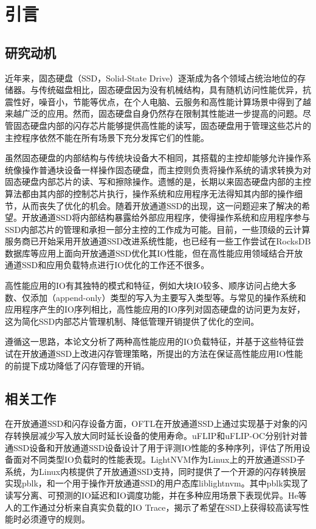 \chapter{引言}
\label{cha:intro}

\section{研究动机}
近年来，固态硬盘（SSD，Solid-State Drive）逐渐成为各个领域占统治地位的存储器。与传统磁盘相比，固态硬盘因为没有机械结构，具有随机访问性能优异，抗震性好，噪音小，节能等优点，在个人电脑、云服务和高性能计算场景中得到了越来越广泛的应用。然而，固态硬盘自身仍然存在限制其性能进一步提高的问题。尽管固态硬盘内部的闪存芯片能够提供高性能的读写，固态硬盘用于管理这些芯片的主控程序依然不能在所有场景下充分发挥它们的性能\cite{bjorling_lightnvm:_nodate}。

虽然固态硬盘的内部结构与传统块设备大不相同，其搭载的主控却能够允许操作系统像操作普通块设备一样操作固态硬盘，而主控则负责将操作系统的请求转换为对固态硬盘内部芯片的读、写和擦除操作。遗憾的是，长期以来固态硬盘内部的主控算法都由其内部的控制芯片执行，操作系统和应用程序无法得知其内部的操作细节，从而丧失了优化的机会。随着开放通道SSD的出现，这一问题迎来了解决的希望。开放通道SSD将内部结构暴露给外部应用程序，使得操作系统和应用程序参与SSD内部芯片的管理和承担一部分主控的工作成为可能。目前，一些顶级的云计算服务商已开始采用开放通道SSD改进系统性能\cite{wang_efficient_2014}，也已经有一些工作尝试在RocksDB数据库等应用上面向开放通道SSD优化其IO性能\cite{gonzalez_towards_nodate}，但在高性能应用领域结合开放通道SSD和应用负载特点进行IO优化的工作还不很多。

高性能应用的IO有其独特的模式和特征，例如大块IO较多、顺序访问占绝大多数、仅添加（append-only）类型的写入为主要写入类型等\cite{shan_characterizing_2008}。与常见的操作系统和应用程序产生的IO序列相比，高性能应用的IO序列对固态硬盘的访问更为友好，这为简化SSD内部芯片管理机制、降低管理开销提供了优化的空间。

遵循这一思路，本论文分析了两种高性能应用的IO负载特征，并基于这些特征尝试在开放通道SSD上改进闪存管理策略，所提出的方法在保证高性能应用IO性能的前提下成功降低了闪存管理的开销。

\section{相关工作}
在开放通道SSD和闪存设备方面，OFTL\cite{lu_extending_nodate}在开放通道SSD上通过实现基于对象的闪存转换层减少写入放大同时延长设备的使用寿命。uFLIP\cite{bouganim_uflip:_nodate}和uFLIP-OC\cite{picoli_uflip-oc:_2017}分别针对普通SSD设备和开放通道SSD设备设计了用于评测IO性能的多种序列，评估了所用设备面对不同类型IO负载时的性能表现。LightNVM\cite{bjorling_lightnvm:_nodate}作为Linux上的开放通道SSD子系统，为Linux内核提供了开放通道SSD支持，同时提供了一个开源的闪存转换层实现pblk，和一个用于操作开放通道SSD的用户态库liblightnvm。其中pblk实现了读写分离、可预测的IO延迟和IO调度功能，并在多种应用场景下表现优异\cite{bjorling_open-channel_2017}。He等人的工作\cite{he_unwritten_2017}通过分析来自真实负载的IO Trace，揭示了希望在SSD上获得较高读写性能时必须遵守的规则。

